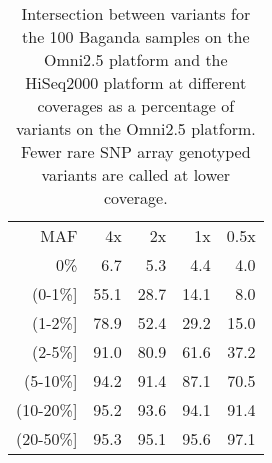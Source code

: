 \begin{table}[htp]
\centering
\begin{tabular}{rrrrr}
{\gls{MAF}} & {4x} & {2x} & {1x} & {0.5x} \\
0\%                        & 6.7                       & 5.3                       & 4.4                       & 4.0                         \\
(0-1\%{]}                  & 55.1                      & 28.7                      & 14.1                      & 8.0                         \\
(1-2\%{]}                  & 78.9                      & 52.4                      & 29.2                      & 15.0                        \\
(2-5\%{]}                  & 91.0                      & 80.9                      & 61.6                      & 37.2                        \\
(5-10\%{]}                 & 94.2                      & 91.4                      & 87.1                      & 70.5                        \\
(10-20\%{]}                & 95.2                      & 93.6                      & 94.1                      & 91.4                        \\
(20-50\%{]}                & 95.3                      & 95.1                      & 95.6                      & 97.1                       
\end{tabular}
\caption{Intersection between variants for the 100 Baganda samples on the Omni2.5 platform and the HiSeq2000 platform at different coverages as a percentage of variants on the Omni2.5 platform. Fewer rare SNP array genotyped variants are called at lower coverage.}
\label{tab:downsampling_omni_intersection}
\end{table}
